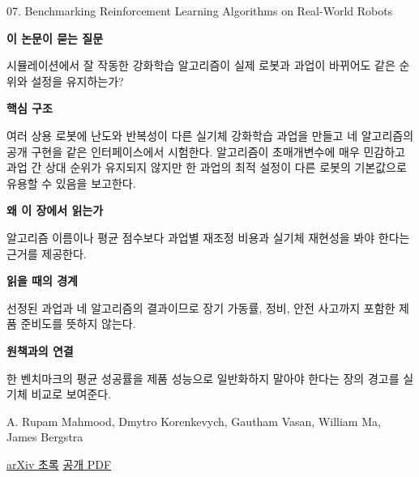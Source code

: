\documentclass[11pt,openany]{book}
\begin{document}
\begin{termcard}{07. Benchmarking Reinforcement Learning Algorithms on Real-World Robots}

\par

\medskip

{\sffamily\bfseries\color{deepblue} 이 논문이 묻는 질문}\par

시뮬레이션에서 잘 작동한 강화학습 알고리즘이 실제 로봇과 과업이 바뀌어도 같은 순위와 설정을 유지하는가?

\smallskip

{\sffamily\bfseries\color{deepblue} 핵심 구조}\par

여러 상용 로봇에 난도와 반복성이 다른 실기체 강화학습 과업을 만들고 네 알고리즘의 공개 구현을 같은 인터페이스에서 시험한다. 알고리즘이 초매개변수에 매우 민감하고 과업 간 상대 순위가 유지되지 않지만 한 과업의 최적 설정이 다른 로봇의 기본값으로 유용할 수 있음을 보고한다.

\smallskip

{\sffamily\bfseries\color{deepblue} 왜 이 장에서 읽는가}\par

알고리즘 이름이나 평균 점수보다 과업별 재조정 비용과 실기체 재현성을 봐야 한다는 근거를 제공한다.

\smallskip

{\sffamily\bfseries\color{coral} 읽을 때의 경계}\par

선정된 과업과 네 알고리즘의 결과이므로 장기 가동률, 정비, 안전 사고까지 포함한 제품 준비도를 뜻하지 않는다.

\smallskip

{\sffamily\bfseries\color{teal} 원책과의 연결}\par

한 벤치마크의 평균 성공률을 제품 성능으로 일반화하지 말아야 한다는 장의 경고를 실기체 비교로 보여준다.

\medskip

{\footnotesize\color{muted} A. Rupam Mahmood, Dmytro Korenkevych, Gautham Vasan, William Ma, James Bergstra\par

\href{https://arxiv.org/abs/1809.07731}{arXiv 초록} \quad \href{https://arxiv.org/pdf/1809.07731}{공개 PDF}\par}

\end{termcard}
\end{document}
